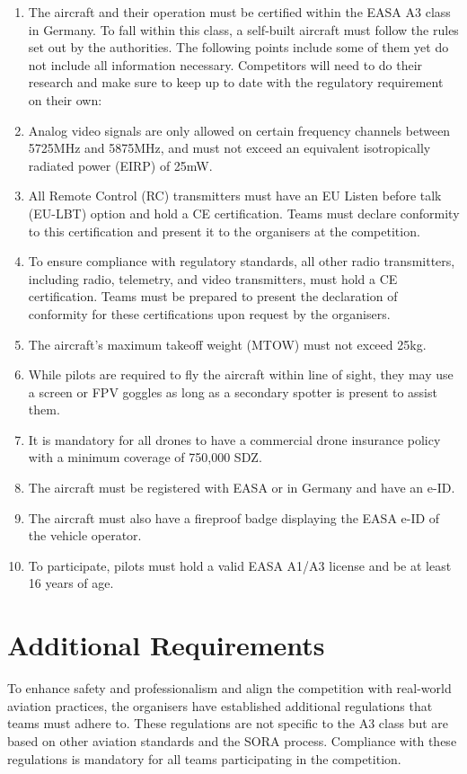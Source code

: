 \documentclass{article}
\begin{document}
\begin{enumerate}
  \item The aircraft and their operation must be certified within the EASA A3 class in Germany. To fall within this class, a self-built aircraft must follow the rules set out by the authorities. 
  The following points include some of them yet do not include all information necessary. Competitors will need to do their research and make sure to keep up to date with the regulatory requirement on their own:
  \item Analog video signals are only allowed on certain frequency channels between 5725MHz and 5875MHz, and must not exceed an equivalent isotropically radiated power (EIRP) of 25mW.
  \item All Remote Control (RC) transmitters must have an EU Listen before talk (EU-LBT) option and hold a CE certification. Teams must declare conformity to this certification and present it to the organisers at the competition.
  \item To ensure compliance with regulatory standards, all other radio transmitters, including radio, telemetry, and video transmitters, must hold a CE certification. Teams must be prepared to present the declaration of conformity for these certifications upon request by the organisers.
  \item The aircraft's maximum takeoff weight (MTOW) must not exceed 25kg.
  \item While pilots are required to fly the aircraft within line of sight, they may use a screen or FPV goggles as long as a secondary spotter is present to assist them.
  \item It is mandatory for all drones to have a commercial drone insurance policy with a minimum coverage of 750,000 SDZ.
  \item The aircraft must be registered with EASA or in Germany and have an e-ID.
  \item The aircraft must also have a fireproof badge displaying the EASA e-ID of the vehicle operator.
  \item To participate, pilots must hold a valid EASA A1/A3 license and be at least 16 years of age.
\end{enumerate}

\section{Additional Requirements}
To enhance safety and professionalism and align the competition with real-world aviation practices, the organisers have established additional regulations that teams must adhere to. These regulations are not specific to the A3 class but are based on other aviation standards and the SORA process. Compliance with these regulations is mandatory for all teams participating in the competition.
\end{document}
